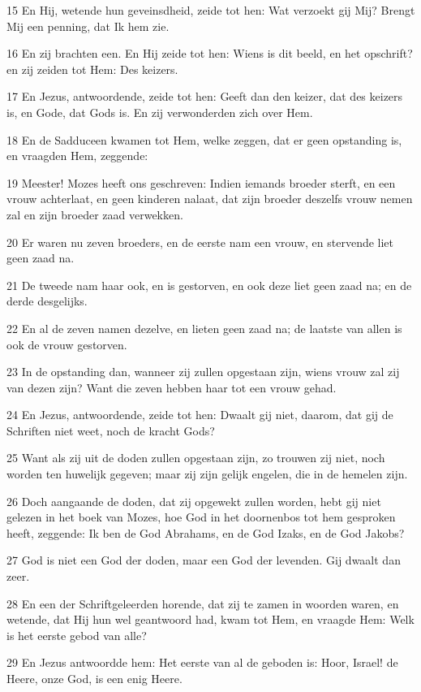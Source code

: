 \par 15 En Hij, wetende hun geveinsdheid, zeide tot hen: Wat verzoekt gij Mij? Brengt Mij een penning, dat Ik hem zie.
\par 16 En zij brachten een. En Hij zeide tot hen: Wiens is dit beeld, en het opschrift? en zij zeiden tot Hem: Des keizers.
\par 17 En Jezus, antwoordende, zeide tot hen: Geeft dan den keizer, dat des keizers is, en Gode, dat Gods is. En zij verwonderden zich over Hem.
\par 18 En de Sadduceen kwamen tot Hem, welke zeggen, dat er geen opstanding is, en vraagden Hem, zeggende:
\par 19 Meester! Mozes heeft ons geschreven: Indien iemands broeder sterft, en een vrouw achterlaat, en geen kinderen nalaat, dat zijn broeder deszelfs vrouw nemen zal en zijn broeder zaad verwekken.
\par 20 Er waren nu zeven broeders, en de eerste nam een vrouw, en stervende liet geen zaad na.
\par 21 De tweede nam haar ook, en is gestorven, en ook deze liet geen zaad na; en de derde desgelijks.
\par 22 En al de zeven namen dezelve, en lieten geen zaad na; de laatste van allen is ook de vrouw gestorven.
\par 23 In de opstanding dan, wanneer zij zullen opgestaan zijn, wiens vrouw zal zij van dezen zijn? Want die zeven hebben haar tot een vrouw gehad.
\par 24 En Jezus, antwoordende, zeide tot hen: Dwaalt gij niet, daarom, dat gij de Schriften niet weet, noch de kracht Gods?
\par 25 Want als zij uit de doden zullen opgestaan zijn, zo trouwen zij niet, noch worden ten huwelijk gegeven; maar zij zijn gelijk engelen, die in de hemelen zijn.
\par 26 Doch aangaande de doden, dat zij opgewekt zullen worden, hebt gij niet gelezen in het boek van Mozes, hoe God in het doornenbos tot hem gesproken heeft, zeggende: Ik ben de God Abrahams, en de God Izaks, en de God Jakobs?
\par 27 God is niet een God der doden, maar een God der levenden. Gij dwaalt dan zeer.
\par 28 En een der Schriftgeleerden horende, dat zij te zamen in woorden waren, en wetende, dat Hij hun wel geantwoord had, kwam tot Hem, en vraagde Hem: Welk is het eerste gebod van alle?
\par 29 En Jezus antwoordde hem: Het eerste van al de geboden is: Hoor, Israel! de Heere, onze God, is een enig Heere.
